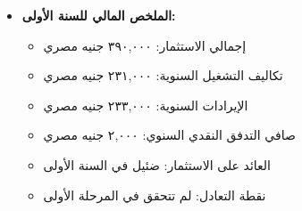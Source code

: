 \begin{itemize}
    \item \textbf{الملخص المالي للسنة الأولى:}
    \begin{itemize}
        \item إجمالي الاستثمار: ٣٩٠,٠٠٠ جنيه مصري
        \item تكاليف التشغيل السنوية: ٢٣١,٠٠٠ جنيه مصري
        \item الإيرادات السنوية: ٢٣٣,٠٠٠ جنيه مصري
        \item صافي التدفق النقدي السنوي: ٢,٠٠٠ جنيه مصري
        \item العائد على الاستثمار: ضئيل في السنة الأولى
        \item نقطة التعادل: لم تتحقق في المرحلة الأولى
    \end{itemize}
\end{itemize}

